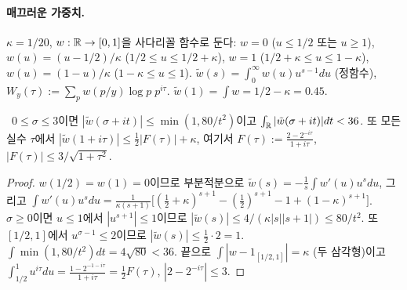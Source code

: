 \paragraph{매끄러운 가중치.} $\kappa=1/20$, $w:\mathbb{R}\to[0,1]$을 사다리꼴 함수로 둔다:
$w=0$ ($u\le1/2$ 또는 $u\ge1$), $w(u)=(u-1/2)/\kappa$ ($1/2\le u\le1/2+\kappa$), $w=1$ ($1/2+\kappa\le u\le1-\kappa$),
$w(u)=(1-u)/\kappa$ ($1-\kappa\le u\le1$). $\tilde w(s)=\int_0^\infty w(u)u^{s-1}du$ (정함수),
$W_y(\tau):=\sum_{p}w(p/y)\log p\;p^{i\tau}$.
$\tilde w(1)=\int w=1/2-\kappa=0.45$.

\begin{lemma}[Mellin 평가]\label{VKGAP:lem-mellin}
\PROVED\ $0\le\sigma\le3$이면 $|\tilde w(\sigma+it)|\le\min(1,80/t^2)$이고 $\int_{\mathbb{R}}|\tilde w(\sigma+it)|dt<36$.
또 모든 실수 $\tau$에서 $|\tilde w(1+i\tau)|\le \tfrac12|F(\tau)|+\kappa$, 여기서
$F(\tau):=\frac{2-2^{-i\tau}}{1+i\tau}$, $|F(\tau)|\le 3/\sqrt{1+\tau^2}$.
\end{lemma}
\begin{proof}
$w(1/2)=w(1)=0$이므로 부분적분으로 $\tilde w(s)=-\frac1s\int w'(u)u^sdu$, 그리고
$\int w'(u)u^sdu=\frac{1}{\kappa(s+1)}\big[(\tfrac12+\kappa)^{s+1}-(\tfrac12)^{s+1}-1+(1-\kappa)^{s+1}\big]$.
$\sigma\ge0$이면 $u\le1$에서 $|u^{s+1}|\le1$이므로 $|\tilde w(s)|\le 4/(\kappa|s||s+1|)\le 80/t^2$.
또 $[1/2,1]$에서 $u^{\sigma-1}\le2$이므로 $|\tilde w(s)|\le\frac12\cdot2=1$.
$\int\min(1,80/t^2)dt=4\sqrt{80}<36$.
끝으로 $\int|w-1_{[1/2,1]}|=\kappa$ (두 삼각형)이고 $\int_{1/2}^1u^{i\tau}du=\frac{1-2^{-1-i\tau}}{1+i\tau}=\frac12F(\tau)$,
$|2-2^{-i\tau}|\le3$.
\end{proof}

